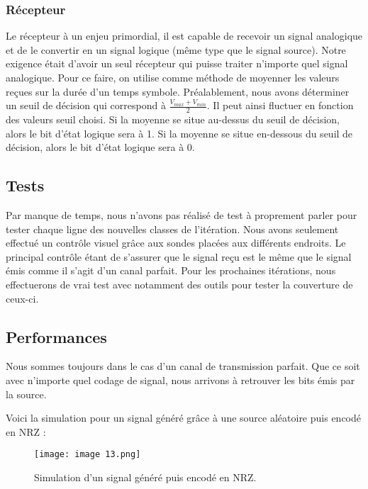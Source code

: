 \subsubsection{Récepteur}

Le récepteur à un enjeu primordial, il est capable de recevoir un signal analogique et de le convertir en un signal logique (même type que le signal source). Notre exigence était d'avoir un seul récepteur qui puisse traiter n'importe quel signal analogique.
Pour ce faire, on utilise comme méthode de moyenner les valeurs reçues sur la durée d'un temps symbole. Préalablement, nous avons déterminer un seuil de décision qui correspond à $\frac{V_{max} + V_{min}}{2}$.
Il peut ainsi fluctuer en fonction des valeurs seuil choisi. Si la moyenne se situe au-dessus du seuil de décision, alors le bit d'état logique sera à 1. Si la moyenne se situe en-dessous du seuil de décision, alors le bit d'état logique sera à 0.

\subsection{Tests}

Par manque de temps, nous n'avons pas réalisé de test à proprement parler pour tester chaque ligne des nouvelles classes de l'itération. Nous avons seulement effectué un contrôle visuel grâce aux sondes placées aux différents endroits. Le principal contrôle étant de s'assurer que le signal reçu est le même que le signal émis comme il s'agit d'un canal parfait.
Pour les prochaines itérations, nous effectuerons de vrai test avec notamment des outils pour tester la couverture de ceux-ci.

\subsection{Performances}

Nous sommes toujours dans le cas d'un canal de transmission parfait. Que ce soit avec n'importe quel codage de signal, nous arrivons à retrouver les bits émis par la source.

Voici la simulation pour un signal généré grâce à une source aléatoire puis encodé en NRZ :

\begin{figure}[H]
    \centering
    \texttt{[image: image 13.png]}
    \caption{\label{fig:image13}Simulation d'un signal généré puis encodé en NRZ.}
\end{figure}

